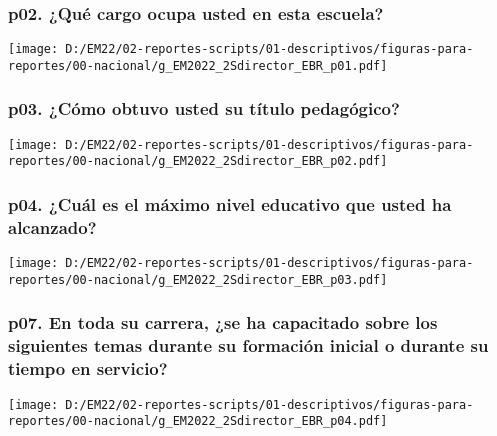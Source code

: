 \documentclass[
]{article}
\begin{document}
\hypertarget{p02.-quuxe9-cargo-ocupa-usted-en-esta-escuela}{%
\subsubsection{p02. ¿Qué cargo ocupa usted en esta
escuela?}\label{p02.-quuxe9-cargo-ocupa-usted-en-esta-escuela}}

\texttt{[image: D:/EM22/02-reportes-scripts/01-descriptivos/figuras-para-reportes/00-nacional/g\_EM2022\_2Sdirector\_EBR\_p01.pdf]}

\hypertarget{p03.-cuxf3mo-obtuvo-usted-su-tuxedtulo-pedaguxf3gico}{%
\subsubsection{p03. ¿Cómo obtuvo usted su título
pedagógico?}\label{p03.-cuxf3mo-obtuvo-usted-su-tuxedtulo-pedaguxf3gico}}

\texttt{[image: D:/EM22/02-reportes-scripts/01-descriptivos/figuras-para-reportes/00-nacional/g\_EM2022\_2Sdirector\_EBR\_p02.pdf]}

\hypertarget{p04.-cuuxe1l-es-el-muxe1ximo-nivel-educativo-que-usted-ha-alcanzado}{%
\subsubsection{p04. ¿Cuál es el máximo nivel educativo que usted ha
alcanzado?}\label{p04.-cuuxe1l-es-el-muxe1ximo-nivel-educativo-que-usted-ha-alcanzado}}

\texttt{[image: D:/EM22/02-reportes-scripts/01-descriptivos/figuras-para-reportes/00-nacional/g\_EM2022\_2Sdirector\_EBR\_p03.pdf]}

\hypertarget{p07.-en-toda-su-carrera-se-ha-capacitado-sobre-los-siguientes-temas-durante-su-formaciuxf3n-inicial-o-durante-su-tiempo-en-servicio}{%
\subsubsection{p07. En toda su carrera, ¿se ha capacitado sobre los
siguientes temas durante su formación inicial o durante su tiempo en
servicio?}\label{p07.-en-toda-su-carrera-se-ha-capacitado-sobre-los-siguientes-temas-durante-su-formaciuxf3n-inicial-o-durante-su-tiempo-en-servicio}}

\texttt{[image: D:/EM22/02-reportes-scripts/01-descriptivos/figuras-para-reportes/00-nacional/g\_EM2022\_2Sdirector\_EBR\_p04.pdf]}
\end{document}
